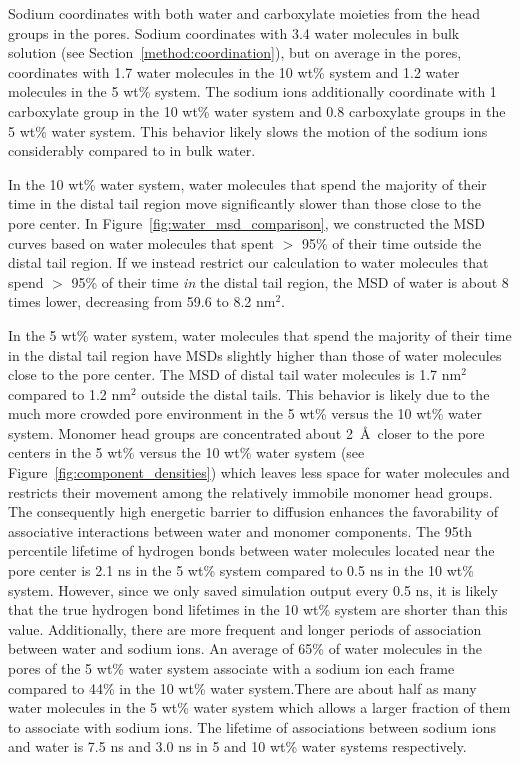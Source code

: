 \documentclass[journal=jpcbfk,manuscript=article]{achemso}
\begin{document}
  Sodium coordinates with both water and carboxylate moieties from the head
  groups in the pores. Sodium coordinates with 3.4 water molecules in bulk 
  solution (see Section~\ref{method:coordination}), but on average in the pores,
  coordinates with 1.7 water molecules in the 10 wt\% system and 1.2 water
  molecules in the 5 wt\% system. The sodium ions additionally coordinate with
  1 carboxylate group in the 10 wt\% water system and 0.8 carboxylate groups 
  in the 5 wt\% water system. This behavior likely slows the motion of the 
  sodium ions considerably compared to in bulk water.

  In the 10 wt\% water system, water molecules that spend the majority of 
  their time in the distal tail region move significantly slower than those
  close to the pore center. In Figure~\ref{fig:water_msd_comparison}, we 
  constructed the MSD curves based on water molecules that spent $>$ 95\% of their
  time outside the distal tail region. If we instead restrict our calculation to
  water molecules that spend $>$ 95\% of their time \textit{in} the distal tail region, 
  the MSD of water is about 8 times lower, decreasing from 59.6 to 8.2 nm$^2$. 

  In the 5 wt\% water system, water molecules that spend the majority of their 
  time in the distal tail region have MSDs slightly higher than those of water molecules
  close to the pore center. The MSD of distal tail water molecules is 1.7 nm$^2$
  compared to 1.2 nm$^2$ outside the distal tails. This behavior is likely due to the
  much more crowded pore environment in the 5 wt\% versus the 10 wt\% water system. 
  Monomer head groups are concentrated about 2~\AA~closer to the pore centers in the
  5 wt\% versus the 10 wt\% water system (see Figure~\ref{fig:component_densities})
  which leaves less space for water molecules and restricts their movement among the 
  relatively immobile monomer head groups. The consequently high energetic barrier 
  to diffusion enhances the favorability of associative interactions between water
  and monomer components. The 95th percentile lifetime of hydrogen bonds between 
  water molecules located near the pore center is 2.1 ns in the 5 wt\% system compared
  to 0.5 ns in the 10 wt\% system. However, since we only saved simulation output 
  every 0.5 ns, it is likely that the true hydrogen bond lifetimes in the 10 wt\% 
  system are shorter than this value. Additionally, there are more frequent and longer
  periods of association between water and sodium ions. An average of 65\% of water 
  molecules in the pores of the 5 wt\% water system associate with a sodium ion each
  frame compared to 44\% in the 10 wt\% water system.There are about half as many water
  molecules in the 5 wt\% water system which allows a larger fraction of them to 
  associate with sodium ions. The lifetime of associations between sodium ions and 
  water is 7.5 ns and 3.0 ns in 5 and 10 wt\% water systems respectively.
  
\end{document}
